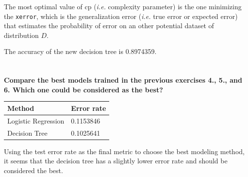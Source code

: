 \documentclass[
  12pt,
  oneside]{report}
\begin{document}
The most optimal value of cp (\emph{i.e.} complexity parameter) is the one minimizing the \texttt{xerror}, which is the generalization error (\emph{i.e.} true error or expected error) that estimates the probability of error on an other potential dataset of distribution \(D\).

The accuracy of the new decision tree is 0.8974359.

\newpage

\hypertarget{section-8}{%
\section{}\label{section-8}}

\textbf{Compare the best models trained in the previous exercises 4., 5., and 6. Which one could be considered as the best?}

\begin{longtable}[]{@{}ll@{}}
\toprule
Method & Error rate\tabularnewline
\midrule
\endhead
Logistic Regression & 0.1153846\tabularnewline
Decision Tree & 0.1025641\tabularnewline
\bottomrule
\end{longtable}

Using the test error rate as the final metric to choose the best modeling method, it seems that the decision tree has a slightly lower error rate and should be considered the best.


\singlespacing %
\end{document}
